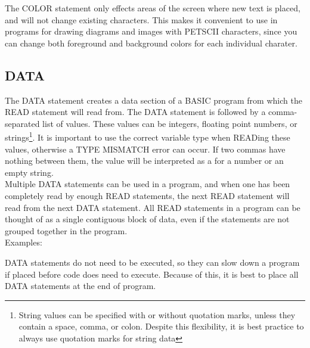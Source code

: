 The {\ttfamily COLOR} statement only effects areas of the screen where new text
is placed, and will not change existing characters.  This makes it convenient
to use in programs for drawing diagrams and images with PETSCII characters,
since you can change both foreground and background colors for each individual
charater.\\

\subsection{DATA}

The {\ttfamily DATA} statement creates a data section of a BASIC program from
which the {\ttfamily READ} statement will read from.  The {\ttfamily DATA}
statement is followed by a comma-separated list of values.  These values can be
integers, floating point numbers, or strings\footnote{String values can be
specified with or without quotation marks, unless they contain a space, comma,
or colon.  Despite this flexibility, it is best practice to always use
quotation marks for string data}.  It is important to use the correct variable
type when {\ttfamily READ}ing these values, otherwise a {\ttfamily TYPE
MISMATCH} error can occur.  If two commas have nothing between them, the value
will be interpreted as a {} for a number or an empty string.\\

Multiple {\ttfamily DATA} statements can be used in a program, and when one has
been completely read by enough {\ttfamily READ} statements, the next {\ttfamily
READ} statement will read from the next {\ttfamily DATA} statement.  All
{\ttfamily READ} statements in a program can be thought of as a single
contiguous block of data, even if the statements are not grouped together in
the program.\\

Examples:\\


{\ttfamily DATA} statements do not need to be executed, so they can slow down a
program if placed before code does need to execute.  Because of this, it is
best to place all {\ttfamily DATA} statements at the end of program.\\

